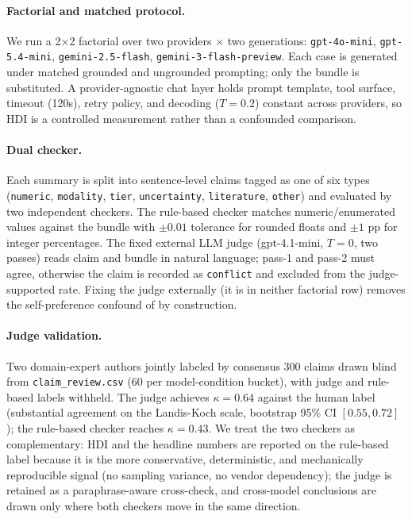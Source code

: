\documentclass{article}
\theoremstyle{plain}
\begin{document}
\paragraph{Factorial and matched protocol.} We run a 2$\times$2 factorial over two providers $\times$ two generations: \texttt{gpt-4o-mini}, \texttt{gpt-5.4-mini}, \texttt{gemini-2.5-flash}, \texttt{gemini-3-flash-preview}. Each case is generated under matched grounded and ungrounded prompting; only the bundle is substituted. A provider-agnostic chat layer holds prompt template, tool surface, timeout (120s), retry policy, and decoding ($T{=}0.2$) constant across providers, so HDI is a controlled measurement rather than a confounded comparison.

\paragraph{Dual checker.} Each summary is split into sentence-level claims tagged as one of six types (\texttt{numeric}, \texttt{modality}, \texttt{tier}, \texttt{uncertainty}, \texttt{literature}, \texttt{other}) and evaluated by two independent checkers. The rule-based checker matches numeric/enumerated values against the bundle with $\pm 0.01$ tolerance for rounded floats and $\pm 1$ pp for integer percentages. The fixed external LLM judge (gpt-4.1-mini, $T{=}0$, two passes) reads claim and bundle in natural language; pass-1 and pass-2 must agree, otherwise the claim is recorded as \texttt{conflict} and excluded from the judge-supported rate. Fixing the judge externally (it is in neither factorial row) removes the self-preference confound of \citet{panickssery2024llm} by construction.

\paragraph{Judge validation.} Two domain-expert authors jointly labeled by consensus 300 claims drawn blind from \texttt{claim\_review.csv} (60 per model-condition bucket), with judge and rule-based labels withheld. The judge achieves $\kappa{=}0.64$ against the human label (substantial agreement on the Landis-Koch scale, bootstrap 95\% CI $[0.55, 0.72]$); the rule-based checker reaches $\kappa{=}0.43$. We treat the two checkers as complementary: HDI and the headline numbers are reported on the rule-based label because it is the more conservative, deterministic, and mechanically reproducible signal (no sampling variance, no vendor dependency); the judge is retained as a paraphrase-aware cross-check, and cross-model conclusions are drawn only where both checkers move in the same direction.
\end{document}
